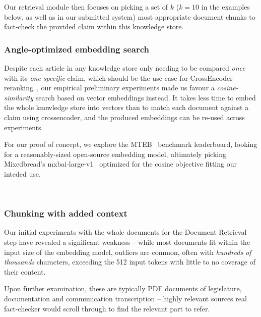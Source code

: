 Our retrieval module then focuses on picking a set of $k$ ($k=10$ in the examples below, as well as in our submitted system) most appropriate document chunks to fact-check the provided claim within this knowledge store.

\subsubsection{Angle-optimized embedding search}
\label{sec:knn}
Despite each article in any knowledge store only needing to be compared \textit{once} with its \textit{one specific} claim, which should be the use-case for CrossEncoder reranking~\cite{dejean2024thoroughcomparisoncrossencodersllms}, our empirical preliminary experiments made us favour a \textit{cosine-similarity} search based on vector embeddings instead.
It takes less time to embed the whole knowledge store into vectors than to match each document against a claim using crossencoder, and the produced embeddings can be re-used across experiments.

For our proof of concept, we explore the MTEB~\cite{muennighoff-etal-2023-mteb} benchmark leaderboard, looking for a reasonably-sized open-source embedding model, ultimately picking Mixedbread's mxbai-large-v1~\cite{li-li-2024-aoe,emb2024mxbai} optimized for the cosine objective fitting our inteded use.

\
\subsubsection{Chunking with added context}
Our initial experiments with the whole \averitec{}  documents for the Document Retrieval step have revealed a significant weakness -- while most documents fit within the input size of the embedding model, outliers are common, often with \textit{hundreds of thousands} characters, exceeding the 512 input tokens with little to no coverage of their content.

Upon further examination, these are typically PDF documents of legislature, documentation and communication transcription -- highly relevant sources real fact-checker would scroll through to find the relevant part to refer. 

